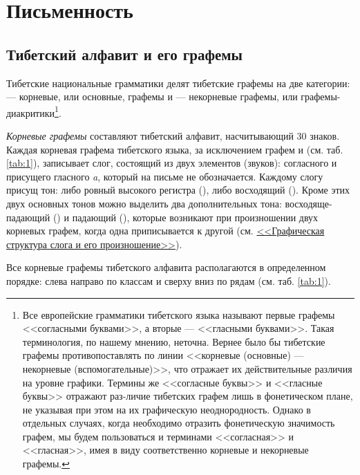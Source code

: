 \chapter{Письменность}
\section{Тибетский алфавит и его графемы}
Тибетские национальные грамматики делят тибетские графемы на две категории:  --- корневые, или основные, графемы и	 --- некорневые графемы, или графемы-диакритики\footnote[9]{Все европейские грамматики тибетского языка называют первые графемы <<согласными буквами>>, а вторые --- <<гласными буквами>>. Такая терминология, по нашему мнению, неточна. Вернее было бы тибетские графемы противопоставлять по линии <<корневые (основные) --- некорневые (вспомогательные)>>, что отражает их действительные различия на уровне графики. Термины же <<согласные буквы>> и <<гласные буквы>> отражают раз-личие тибетских графем лишь в фонетическом плане, не указывая при этом на их графическую неоднородность. Однако в отдельных случаях, когда необходимо отразить фонетическую значимость графем, мы будем пользоваться и терминами <<согласная>> и <<гласная>>, имея в виду соответственно корневые и некорневые графемы.}.

\emph{Корневые графемы} составляют тибетский алфавит, насчитывающий 30 знаков. Каждая корневая графема тибетского языка, за исключением графем  и  (см. таб. \ref{tab:1}), записывает слог, состоящий из двух элементов (звуков): согласного и присущего гласного \emph{a}, который на письме не обозначается. Каждому слогу присущ тон: либо ровный высокого регистра (\toneR), либо восходящий (\toneV). Кроме этих двух основных тонов можно выделить два дополнительных тона: восходяще-падающий (\toneVN) и падающий (\toneN), которые возникают при произношении двух корневых графем, когда одна приписывается к другой (см. \hyperref[sec:gss]{<<Графическая структура слога и его произношение>>}).

Все корневые графемы тибетского алфавита располагаются в определенном порядке: слева направо по классам и сверху вниз по рядам (см. таб. \ref{tab:1}).

